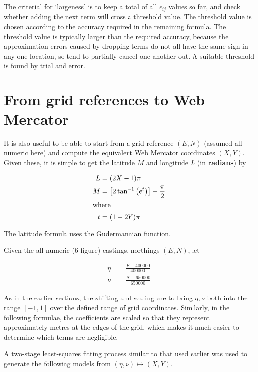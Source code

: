 \documentclass[10pt,a4paper]{article}
\begin{document}
The criterial for `largeness' is to keep a total of all $\epsilon_{ij}$ values
so far, and check whether adding the next term will cross a threshold value.
The threshold value is chosen according to the accuracy required in the
remaining formula.  The threshold value is typically larger than the required
accuracy, because the approximation errors caused by dropping terms do not all
have the same sign in any one location, so tend to partially cancel one another
out.  A suitable threshold is found by trial and error.

\section {From grid references to Web Mercator}
It is also useful to be able to start from a grid reference $(E,N)$ (assumed
all-numeric here) and compute the equivalent Web Mercator coordinates $(X,Y)$.
Given these, it is simple to get the latitude $M$ and longitude $L$ (in
\textbf{radians}) by

\begin{align}
  L &= (2X - 1)\pi \\
  M &= \left[2\tan^{-1}\left(e^t\right)\right] - \frac{\pi}{2} \\
  \label{eqn:y_to_M}
  \intertext{where}
  t &= (1 - 2Y)\pi
\end{align}

The latitude formula uses the Gudermannian function.

Given the all-numeric (6-figure) eastings, northings $(E,N)$, let

\begin{align}
  \eta &= \frac{E - 400000}{400000} \\[1ex]
  \nu  &= \frac{N - 650000}{650000}
\end{align}

As in the earlier sections, the shifting and scaling are to bring $\eta, \nu$
both into the range $[-1,1]$ over the defined range of grid coordinates.
Similarly, in the following formulae, the coefficients are scaled so that they
represent approximately metres at the edges of the grid, which makes it much
easier to determine which terms are negligible.

A two-stage least-squares fitting process similar to that used earlier was used
to generate the following models from $(\eta,\nu) \mapsto (X,Y)$.
\end{document}
